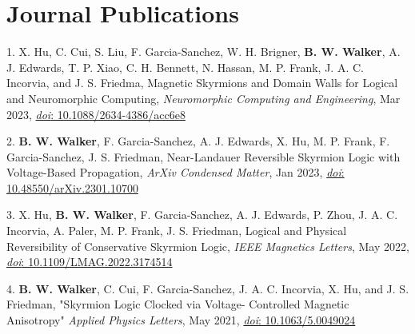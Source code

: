 \documentclass[letterpaper,11pt]{article}
\begin{document}
\section{Journal Publications}
    \begin{itemize}[leftmargin=0.15in, label={}]
        \small{\item{
         1.\hspace{3pt} X. Hu, C. Cui, S. Liu, F. Garcia-Sanchez, W. H. Brigner, \textbf{B. W. Walker}, A. J. Edwards, T. P. Xiao, C. H. Bennett, N. Hassan, M. P. Frank, J. A. C. Incorvia, and J. S. Friedma, Magnetic Skyrmions and Domain Walls for Logical and Neuromorphic Computing, \textit{Neuromorphic Computing and Engineering}, Mar 2023, \href{https://doi.org/10.1088/2634-4386/acc6e8}{\textit{doi}: 10.1088/2634-4386/acc6e8}
        }}\vspace{-5pt}
        \small{\item{
         2.\textbf{\hspace{3pt} B. W. Walker}, F. Garcia-Sanchez, A. J. Edwards, X. Hu, M. P. Frank, F. Garcia-Sanchez, J. S. Friedman, Near-Landauer Reversible Skyrmion Logic with Voltage-Based Propagation, \textit{ArXiv Condensed Matter}, Jan 2023, \href{https://doi.org/10.48550/arXiv.2301.10700}{\textit{doi}: 10.48550/arXiv.2301.10700}
        }}\vspace{-5pt}
        \small{\item{
         3.\hspace{3pt} X. Hu, \textbf{B. W. Walker}, F. Garcia-Sanchez, A. J. Edwards, P. Zhou, J. A. C. Incorvia, A. Paler, M. P. Frank, J. S. Friedman, Logical and Physical Reversibility of Conservative Skyrmion Logic, \textit{IEEE Magnetics Letters}, May 2022, \href{https://doi.org/10.1109/LMAG.2022.3174514}{\textit{doi}: 10.1109/LMAG.2022.3174514}
        }}\vspace{-5pt}
        \small{\item{
         4.\textbf{\hspace{3pt} B. W. Walker}{, C. Cui, F. Garcia-Sanchez, J. A. C. Incorvia, X. Hu, and J. S. Friedman, "Skyrmion Logic Clocked via Voltage- Controlled Magnetic Anisotropy" \textit{Applied Physics Letters}, May 2021, \href{https://doi.org/10.1063/5.0049024}{\textit{doi}: 10.1063/5.0049024}}
        }}\vspace{-5pt}
     \end{itemize}
\end{document}
